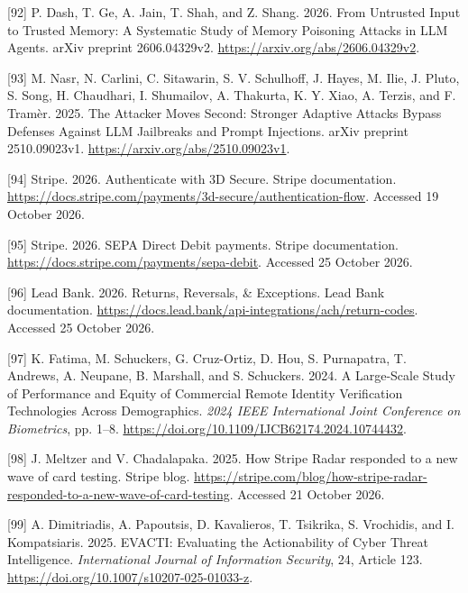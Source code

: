 \documentclass[
  11pt,
]{article}
\newlength{\cslhangindent}
\newlength{\cslentryspacingunit} %
\newenvironment{CSLReferences}[2] %
 {%
  \setlength{\parindent}{0pt}
  \ifodd #1
  \let\oldpar\par
  \def\par{\hangindent=\cslhangindent\oldpar}
  \fi
  \setlength{\parskip}{#2\cslentryspacingunit}
 }%
 {}
\begin{document}
\begin{CSLReferences}{1}{1}
\leavevmode{}%
{[}92{]} P. Dash, T. Ge, A. Jain, T. Shah, and Z. Shang. 2026. From
Untrusted Input to Trusted Memory: A Systematic Study of Memory
Poisoning Attacks in LLM Agents. arXiv preprint 2606.04329v2.
\url{https://arxiv.org/abs/2606.04329v2}.

\leavevmode{}%
{[}93{]} M. Nasr, N. Carlini, C. Sitawarin, S. V. Schulhoff, J. Hayes,
M. Ilie, J. Pluto, S. Song, H. Chaudhari, I. Shumailov, A. Thakurta, K.
Y. Xiao, A. Terzis, and F. Tramèr. 2025. The Attacker Moves Second:
Stronger Adaptive Attacks Bypass Defenses Against LLM Jailbreaks and
Prompt Injections. arXiv preprint 2510.09023v1.
\url{https://arxiv.org/abs/2510.09023v1}.

\leavevmode{}%
{[}94{]} Stripe. 2026. Authenticate with 3D Secure. Stripe
documentation.
\url{https://docs.stripe.com/payments/3d-secure/authentication-flow}.
Accessed 19 October 2026.

\leavevmode{}%
{[}95{]} Stripe. 2026. SEPA Direct Debit payments. Stripe documentation.
\url{https://docs.stripe.com/payments/sepa-debit}. Accessed 25 October
2026.

\leavevmode{}%
{[}96{]} Lead Bank. 2026. Returns, Reversals, \& Exceptions. Lead Bank
documentation.
\url{https://docs.lead.bank/api-integrations/ach/return-codes}. Accessed
25 October 2026.

\leavevmode{}%
{[}97{]} K. Fatima, M. Schuckers, G. Cruz-Ortiz, D. Hou, S. Purnapatra,
T. Andrews, A. Neupane, B. Marshall, and S. Schuckers. 2024. A
Large-Scale Study of Performance and Equity of Commercial Remote
Identity Verification Technologies Across Demographics. \emph{2024 IEEE
International Joint Conference on Biometrics}, pp. 1--8.
\url{https://doi.org/10.1109/IJCB62174.2024.10744432}.

\leavevmode{}%
{[}98{]} J. Meltzer and V. Chadalapaka. 2025. How Stripe Radar responded
to a new wave of card testing. Stripe blog.
\url{https://stripe.com/blog/how-stripe-radar-responded-to-a-new-wave-of-card-testing}.
Accessed 21 October 2026.

\leavevmode{}%
{[}99{]} A. Dimitriadis, A. Papoutsis, D. Kavalieros, T. Tsikrika, S.
Vrochidis, and I. Kompatsiaris. 2025. EVACTI: Evaluating the
Actionability of Cyber Threat Intelligence. \emph{International Journal
of Information Security}, 24, Article 123.
\url{https://doi.org/10.1007/s10207-025-01033-z}.


\end{CSLReferences}
\end{document}
